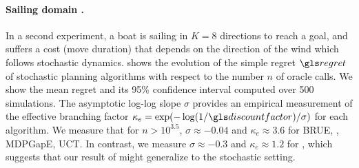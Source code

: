 \paragraph{Sailing domain \citep{Vanderbei1996}.}
In a second experiment, a boat is sailing in $K=8$ directions to reach a goal, and suffers a cost (move duration) that depends on the direction of the wind which follows stochastic dynamics.  shows the evolution of the simple regret $\regret$ of stochastic planning algorithms with respect to the number $n$ of oracle calls. We show the mean regret and its 95\% confidence interval computed over 500 simulations. The asymptotic log-log slope $\sigma$ provides an empirical measurement of the effective branching factor $\kappa_e = \exp(-\log(1/\discount)/\sigma)$ for each algorithm. We measure that for $n>10^{3.5}$, $\sigma \approx-0.04$ and $\kappa_e \approx 3.6$ for \gls{BRUE}, \KLOLOP, \gls{MDPGapE}, \gls{UCT}. In contrast, we measure $\sigma \approx-0.3$ and $\kappa_e \approx 1.2$ for \GBOP, which suggests that our result of  might generalize to the stochastic setting. 

